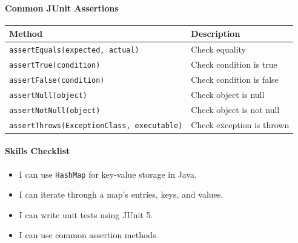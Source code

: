 \documentclass[
  justified,
  openright,
]{tufte-book}
\let\subsection\paragraph
\let\paragraph\paragraph
\let\subsection\paragraph
\let\paragraph\paragraph
\providecommand{\tightlist}{%
  \setlength{\itemsep}{0pt}\setlength{\parskip}{0pt}}
\begin{document}
\subsection{Common JUnit Assertions}\label{common-junit-assertions}

\begin{fullwidth}{\def\LTcaptype{none} %
\begin{longtable}[]{@{}
  >{\raggedright\arraybackslash}p{}
  >{\raggedright\arraybackslash}p{}@{}}
\toprule\noalign{}
\begin{minipage}[b]{\linewidth}\raggedright
Method
\end{minipage} & \begin{minipage}[b]{\linewidth}\raggedright
Description
\end{minipage} \\
\midrule\noalign{}
\endhead
\bottomrule\noalign{}
\endlastfoot
\texttt{assertEquals(expected,\ actual)} & Check equality \\
\texttt{assertTrue(condition)} & Check condition is true \\
\texttt{assertFalse(condition)} & Check condition is false \\
\texttt{assertNull(object)} & Check object is null \\
\texttt{assertNotNull(object)} & Check object is not null \\
\texttt{assertThrows(ExceptionClass,\ executable)} & Check exception is
thrown \\
\end{longtable}
}
\end{fullwidth}

\subsection{Skills Checklist}\label{skills-checklist-85}

\begin{itemize}
\tightlist
\item[$\square$]
  I can use \texttt{HashMap} for key-value storage in Java.
\item[$\square$]
  I can iterate through a map's entries, keys, and values.
\item[$\square$]
  I can write unit tests using JUnit 5.
\item[$\square$]
  I can use common assertion methods.
\end{itemize}
\end{document}
